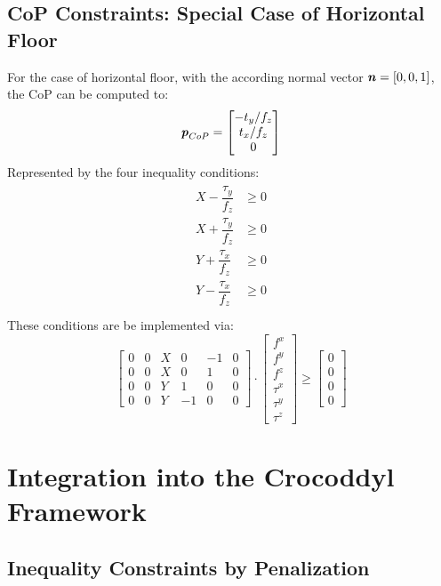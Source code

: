 \subsection{CoP Constraints: Special Case of Horizontal Floor}
For the case of horizontal floor, with the according normal vector $\bm{\mathit{n}}=[0,0,1]$, the \gls{CoP} can be computed to: 
\begin{equation}
\bm{\mathit{p}}_{CoP} = \begin{bmatrix} -t_y/f_z \\ t_x/f_z \\ 0 \end{bmatrix}
\end{equation}
Represented by the four inequality conditions:
\begin{align}
\begin{split}
X-\dfrac{\tau_y}{f_z} &\geq 0 \\
X+\dfrac{\tau_y}{f_z} &\geq 0 \\
Y+\dfrac{\tau_x}{f_z} &\geq 0 \\
Y-\dfrac{\tau_x}{f_z} &\geq 0 \\
\end{split}
\end{align}
These conditions are be implemented via: 
\begin{equation}
\begin{bmatrix} 
0 & 0 & X & 0 & -1 & 0 \\
0 & 0 & X & 0 & 1 & 0 \\
0 & 0 & Y & 1 & 0 & 0 \\
0 & 0 & Y & -1 & 0 & 0 \end{bmatrix} \cdot
\begin{bmatrix} f^x \\ f^y \\ f^z \\ \tau^x \\ \tau^y \\ \tau^z \end{bmatrix} \geq
\begin{bmatrix} 0 \\ 0 \\ 0 \\ 0 \end{bmatrix}
\end{equation}


\section{Integration into the Crocoddyl Framework}
\subsection{Inequality Constraints by Penalization}

